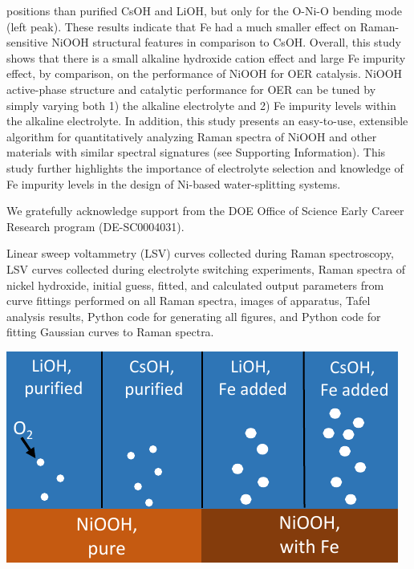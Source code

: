 \documentclass[journal=jpccck,manuscript=article,email=true]{achemso}
\begin{document}
positions than purified CsOH and LiOH, but only for the O-Ni-O bending mode (left peak). These results indicate that Fe had a much smaller effect on Raman-sensitive NiOOH structural features in comparison to CsOH. Overall, this study shows that there is a small alkaline hydroxide cation effect and large Fe impurity effect, by comparison, on the performance of NiOOH for OER catalysis. NiOOH active-phase structure and catalytic performance for OER can be tuned by simply varying both 1) the alkaline electrolyte and 2) Fe impurity levels within the alkaline electrolyte. In addition, this study presents an easy-to-use, extensible algorithm for quantitatively analyzing Raman spectra of NiOOH and other materials with similar spectral signatures (see Supporting Information). This study further highlights the importance of electrolyte selection and knowledge of Fe impurity levels in the design of Ni-based water-splitting systems.

\begin{acknowledgement}
We gratefully acknowledge support from the DOE Office of Science Early Career Research program (DE-SC0004031).
\end{acknowledgement}

\begin{suppinfo}
Linear sweep voltammetry (LSV) curves collected during Raman spectroscopy, LSV curves collected during electrolyte switching experiments, Raman spectra of nickel hydroxide, initial guess, fitted, and calculated output parameters from curve fittings performed on all Raman spectra, images of apparatus, Tafel analysis results, Python code for generating all figures, and Python code for fitting Gaussian curves to Raman spectra.
\end{suppinfo}



\newpage
\includegraphics[width=.9\linewidth]{./images/toc.pdf}
\end{document}
